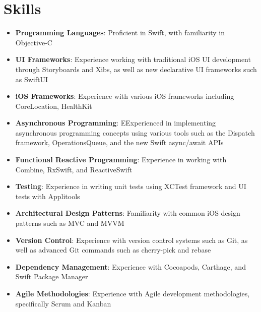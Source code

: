 \documentclass[letterpaper,11pt]{article}
\newcommand{\resumeItemWithColon}[2]{
  \item\small{
    \textbf{#1}{: #2 \vspace{-2pt}}
  }
}
\newcommand{\resumeItemListStart}{\begin{itemize}}
\newcommand{\resumeItemListEnd}{\end{itemize}\vspace{-5pt}}
\begin{document}
\section{Skills}
    \resumeItemListStart
        \resumeItemWithColon{Programming Languages} 
            {Proficient in Swift, with familiarity in Objective-C}
        \resumeItemWithColon{UI Frameworks} 
            {Experience working with traditional iOS UI development through Storyboards and Xibs, as well as new declarative UI frameworks such as SwiftUI}
        \resumeItemWithColon{iOS Frameworks} 
            {Experience with various iOS frameworks including CoreLocation, HealthKit}
        \resumeItemWithColon{Asynchronous Programming} 
            {EExperienced in implementing asynchronous programming concepts using various tools such as the Dispatch framework, OperationsQueue, and the new Swift async/await APIs}
        \resumeItemWithColon{Functional Reactive Programming} 
            {Experience in working with Combine, RxSwift, and ReactiveSwift}
        \resumeItemWithColon{Testing} 
            {Experience in writing unit tests using XCTest framework and UI tests with Applitools}
        \resumeItemWithColon{Architectural Design Patterns} 
            {Familiarity with common iOS design patterns such as MVC and MVVM}
        \resumeItemWithColon{Version Control} 
            {Experience with version control systems such as Git, as well as advanced Git commands such as cherry-pick and rebase}
        \resumeItemWithColon{Dependency Management} 
            {Experience with Cocoapods, Carthage, and Swift Package Manager}
        \resumeItemWithColon{Agile Methodologies} 
            {Experience with Agile development methodologies, specifically Scrum and Kanban} 
    \resumeItemListEnd

\end{document}
